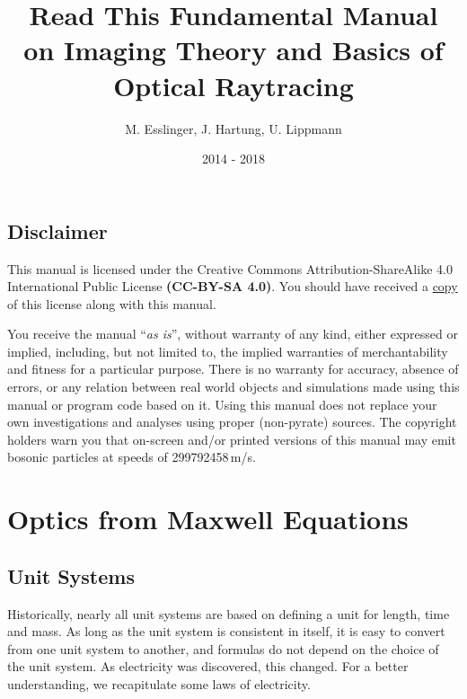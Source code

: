 \documentclass[12pt,a4paper,twoside,openright,BCOR10mm,headsepline,titlepage,abstracton,chapterprefix,final]{scrreprt}
\begin{document}

\titlehead{ }
\subject{Pyrate -- Optical raytracing based on Python}
\title{Read This Fundamental Manual \\ on Imaging Theory and Basics of Optical Raytracing}
\author{M. Esslinger, J. Hartung, U. Lippmann}
\date{2014 - 2018}
\publishers{}
\maketitle

\onehalfspacing

\tableofcontents

\cleardoublepage


\singlespacing

\section{Disclaimer}

This manual is licensed under the
Creative Commons Attribution-ShareAlike 4.0 International Public License
\textbf{(CC-BY-SA 4.0)}.
You should have received a \href{rtfm_license.html}{copy} of this license along with this manual.

You receive the manual ``\emph{as is}'', without warranty of any kind, either expressed or implied, 
including, but not limited to, the implied warranties of merchantability and fitness for a particular purpose.
There is no warranty for accuracy, absence of errors, or any relation between real world objects and simulations made 
using this manual or program code based on it.
Using this manual does not replace your own investigations and analyses using proper (non-pyrate) sources. 
The copyright holders warn you that on-screen and/or printed versions of this manual may emit bosonic particles at speeds of 299792458\,m/s.

\chapter{Optics from Maxwell Equations}
\section{Unit Systems}
Historically, nearly all unit systems are based on defining a unit for length, time and mass.
As long as the unit system is consistent in itself, 
it is easy to convert from one unit system to another, and formulas do not depend on the choice of the unit system.
As electricity was discovered, this changed.
For a better understanding, we recapitulate some laws of electricity.
\end{document}
